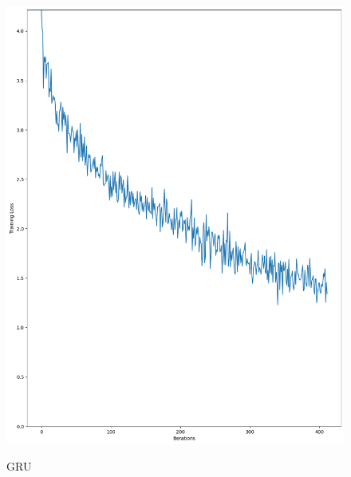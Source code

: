 \documentclass{article}
\begin{document}
\begin{figure}[htbp]
    \centering
    \begin{minipage}[t]{0.19\textwidth}
        \centering
        \includegraphics[width=\textwidth]{img/GRU_learning.png} \\
        \caption{GRU}
        \label{fig:gru}
    \end{minipage}
    \hfill
    \begin{minipage}[t]{0.19\textwidth}
        \centering

\end{minipage}
\end{figure}
\end{document}
